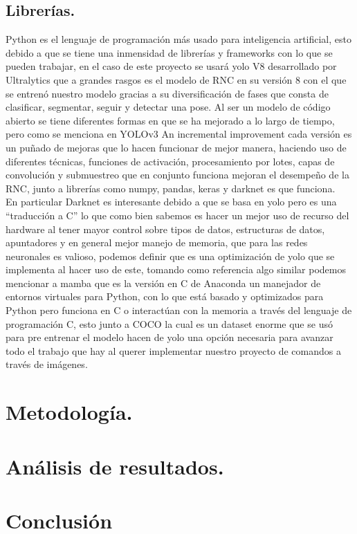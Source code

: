 \documentclass[a4paper, 12pt]{article}
\begin{document}
    \subsection{Librerías.}
    Python es el lenguaje de programación más usado para inteligencia artificial, esto debido a que se tiene una inmensidad de librerías y frameworks con lo que se pueden trabajar, en el caso de este proyecto se usará yolo V8 desarrollado por Ultralytics que a grandes rasgos es el modelo de RNC en su versión 8 con el que se entrenó nuestro modelo gracias a su diversificación de fases que consta de clasificar, segmentar, seguir y detectar una pose.  
    Al ser un modelo de código abierto se tiene diferentes formas en que se ha mejorado a lo largo de tiempo, pero como se menciona en YOLOv3 An incremental improvement\cite{redmon2018yolov3} cada versión es un puñado de mejoras que lo hacen funcionar de mejor manera, haciendo uso de diferentes técnicas, funciones de activación, procesamiento por lotes, capas de convolución y submuestreo que en conjunto funciona mejoran el desempeño de la RNC, junto a librerías como numpy, pandas, keras y darknet es que funciona.\\ 
    En particular Darknet es interesante debido a que se basa en yolo pero es una “traducción a C” lo que como bien sabemos es hacer un mejor uso de recurso del hardware al tener mayor control sobre tipos de datos, estructuras de datos, apuntadores y en general mejor manejo de memoria, que para las redes neuronales es valioso, podemos definir que es una optimización de yolo que se implementa al hacer uso de este, tomando como referencia algo similar podemos mencionar a mamba que es la versión en C de Anaconda un manejador de entornos virtuales para Python, con lo que está basado y optimizados para Python pero funciona en C o interactúan con  la memoria a través del lenguaje de programación C, esto junto a COCO la cual es un dataset enorme que se usó para pre entrenar el modelo hacen de yolo una opción necesaria para avanzar todo el trabajo que hay al querer implementar nuestro proyecto de comandos a través de imágenes.  


    \section{Metodología.}
    
    \section{Análisis de resultados.}

    \section{Conclusión}
    \printbibliography
\end{document}
